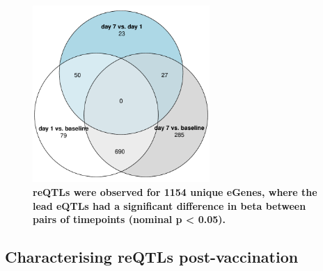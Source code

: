 \begin{figure}
    \centering
    \includegraphics[width=0.6\textwidth]{mainmatter/figures/chapter_03/compare_dge_eqtl.pairwise_reQTL_venn.pdf}
    \caption{
        \textbf{\glspl{reQTL} were observed for 1154 unique eGenes, where the lead \glspl{eQTL} had a significant difference in beta between pairs of timepoints (nominal p < 0.05).}
    }
    \label{fig:hird_reQTL_pairwise_venn}
\end{figure}

\subsection{Characterising reQTLs post-vaccination}

